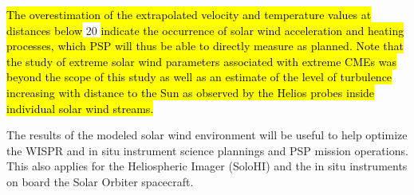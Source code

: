 \hl{The overestimation of the extrapolated velocity and temperature values at distances below } \SI{20}{\Rs} \hl{ indicate the occurrence of solar wind acceleration and heating processes, which PSP will thus be able to directly measure as planned. Note that the study of extreme solar wind parameters associated with extreme CMEs was beyond the scope of this study as well as an estimate of the level of turbulence increasing with distance to the Sun as observed by the Helios probes inside individual solar wind streams. } 

The results of the modeled solar wind environment will be useful to help optimize the WISPR and in situ instrument science plannings and PSP mission operations. This also applies for the Heliospheric Imager (SoloHI) \citep{Howard2013} and the in situ instruments on board the Solar Orbiter spacecraft.

